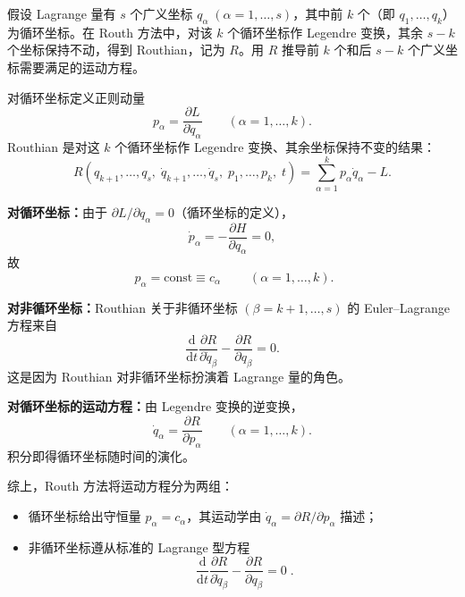 \begin{question}
假设 Lagrange 量有 \(s\) 个广义坐标 \(q_\alpha\;(\alpha=1,\dots,s)\)，其中前 \(k\) 个（即 \(q_1,\dots,q_k\)）为循环坐标。在 Routh 方法中，对该 \(k\) 个循环坐标作 Legendre 变换，其余 \(s-k\) 个坐标保持不动，得到 Routhian，记为 \(R\)。用 \(R\) 推导前 \(k\) 个和后 \(s-k\) 个广义坐标需要满足的运动方程。

\begin{solution}
对循环坐标定义正则动量
\[
p_\alpha = \frac{\partial L}{\partial\dot q_\alpha} \qquad (\alpha = 1,\dots,k).
\]
Routhian 是对这 \(k\) 个循环坐标作 Legendre 变换、其余坐标保持不变的结果：
\[
R(q_{k+1},\dots,q_s,\;\dot q_{k+1},\dots,\dot q_s,\;p_1,\dots,p_k,\;t)
= \sum_{\alpha=1}^{k} p_\alpha\dot q_\alpha - L .
\]

\textbf{对循环坐标：}由于 \(\partial L/\partial q_\alpha = 0\)（循环坐标的定义），
\[
\dot p_\alpha = -\frac{\partial H}{\partial q_\alpha} = 0,
\]
故
\[
\boxed{\;p_\alpha = \text{const} \equiv c_\alpha\;} \qquad (\alpha=1,\dots,k).
\]

\textbf{对非循环坐标：}Routhian 关于非循环坐标 \((\beta = k+1,\dots,s)\) 的 Euler--Lagrange 方程来自
\[
\frac{\mathrm d}{\mathrm d t}\frac{\partial R}{\partial\dot q_\beta}
- \frac{\partial R}{\partial q_\beta} = 0 .
\]
这是因为 Routhian 对非循环坐标扮演着 Lagrange 量的角色。

\textbf{对循环坐标的运动方程：}由 Legendre 变换的逆变换，
\[
\dot q_\alpha = \frac{\partial R}{\partial p_\alpha} \qquad (\alpha=1,\dots,k).
\]
积分即得循环坐标随时间的演化。

综上，Routh 方法将运动方程分为两组：
\begin{itemize}
  \item 循环坐标给出守恒量 \(p_\alpha = c_\alpha\)，其运动学由 \(\dot q_\alpha = \partial R/\partial p_\alpha\) 描述；
  \item 非循环坐标遵从标准的 Lagrange 型方程
  \[
  \boxed{\;\frac{\mathrm d}{\mathrm d t}\frac{\partial R}{\partial\dot q_\beta}
  - \frac{\partial R}{\partial q_\beta} = 0\;}.
  \]
\end{itemize}
\end{solution}
\end{question}



